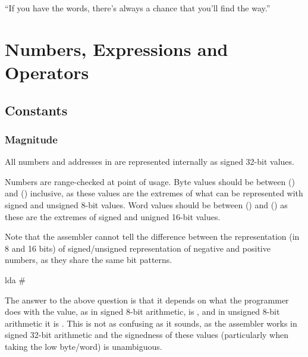 \begin{savequote}
\sffamily
``If you have the words, there's always a chance that you'll find the way.''
\end{savequote}

\chapter{Numbers, Expressions and Operators}

\section{Constants}
\label{section:numberformat}

\label{changelog:20200905range}
\subsection{Magnitude}
All numbers and addresses in \dasm are represented internally as signed 32-bit values.

Numbers are range-checked at point of usage. Byte values should be between  () and  () inclusive, as these values are the extremes of what can be represented with signed and unsigned 8-bit values. Word values should be between  () and  () as these are the extremes of signed and unigned 16-bit values.

Note that the assembler cannot tell the difference between the representation (in 8 and 16 bits) of signed/unsigned representation of negative and positive numbers, as they share the same bit patterns. 

\begin{code}
 lda #%
\end{code}

The answer to the above question is that it depends on what the programmer does with the value, as in signed 8-bit arithmetic,  is , and in unsigned 8-bit arithmetic it is . This is not as confusing as it sounds, as the assembler works in signed 32-bit arithmetic and the signedness of these values (particularly when taking the low byte/word) is unambiguous.


